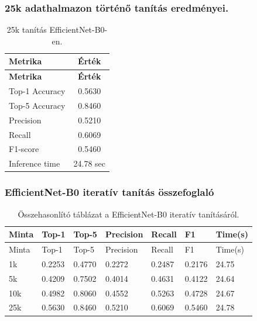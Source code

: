       \subsubsection{25k adathalmazon történő tanítás eredményei.}
      \begin{center}
        \begin{longtable}{l c}
        \caption{25k tanítás EfficientNet-B0-en.} \label{tab:phase03_EfficientNet-B0_25k} \\
        \toprule
        \textbf{Metrika} & \textbf{Érték} \\
        \midrule
        \endfirsthead
        \toprule
        \textbf{Metrika} & \textbf{Érték} \\
        \midrule
        \endhead
        Top-1 Accuracy & 0.5630 \\
        Top-5 Accuracy & 0.8460 \\
        Precision      & 0.5210 \\
        Recall         & 0.6069 \\
        F1-score       & 0.5460 \\
        Inference time & 24.78 sec \\
        \bottomrule
        \end{longtable}
      \end{center}
      
      \subsubsection{EfficientNet-B0 iteratív tanítás összefoglaló}
        \begin{center}
          \begin{longtable}{lllllll}
          \caption{Összehasonlító táblázat a EfficientNet-B0 iteratív tanításáról.}\label{tab:phase3_EfficientNet-B0_summary_table}\\
          \toprule
          Minta & Top-1 & Top-5 & Precision & Recall & F1 & Time(s) \\
          \midrule
          \endfirsthead
          \toprule
          Minta & Top-1 & Top-5 & Precision & Recall & F1 & Time(s) \\
          \midrule
          \endhead
          1k & 0.2253 & 0.4770 & 0.2272 & 0.2487 & 0.2176 & 24.75 \\
          5k & 0.4209 & 0.7502 & 0.4014 & 0.4631 & 0.4122 & 24.64 \\
          10k & 0.4982 & 0.8060 & 0.4552 & 0.5263 & 0.4728 & 24.67 \\
          25k & 0.5630 & 0.8460 & 0.5210 & 0.6069 & 0.5460 & 24.78 \\
          \bottomrule
          \end{longtable}
        \end{center}
        
